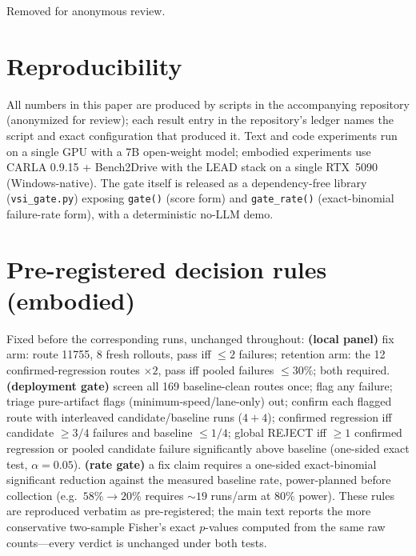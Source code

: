 \documentclass{article}
\begin{document}
\begin{ack}
Removed for anonymous review.
\end{ack}




\appendix

\section{Reproducibility}
All numbers in this paper are produced by scripts in the accompanying repository (anonymized for
review); each result entry in the repository's ledger names the script and exact configuration that
produced it. Text and code experiments run on a single GPU with a 7B open-weight model; embodied
experiments use CARLA 0.9.15 + Bench2Drive with the LEAD stack on a single RTX~5090 (Windows-native).
The gate itself is released as a dependency-free library (\texttt{vsi\_gate.py}) exposing
\texttt{gate()} (score form) and \texttt{gate\_rate()} (exact-binomial failure-rate form), with a
deterministic no-LLM demo.

\section{Pre-registered decision rules (embodied)}
\label{app:prereg}
Fixed before the corresponding runs, unchanged throughout: \textbf{(local panel)} fix arm: route 11755,
8 fresh rollouts, pass iff $\le 2$ failures; retention arm: the 12 confirmed-regression routes
$\times 2$, pass iff pooled failures $\le 30\%$; both required. \textbf{(deployment gate)} screen all
169 baseline-clean routes once; flag any failure; triage pure-artifact flags (minimum-speed/lane-only)
out; confirm each flagged route with interleaved candidate/baseline runs ($4{+}4$); confirmed regression
iff candidate $\ge 3/4$ failures and baseline $\le 1/4$; global REJECT iff $\ge 1$ confirmed regression
or pooled candidate failure significantly above baseline (one-sided exact test, $\alpha=0.05$).
\textbf{(rate gate)} a fix claim requires a one-sided exact-binomial significant reduction against the
measured baseline rate, power-planned before collection (e.g.\ $58\%\!\to\!20\%$ requires
${\sim}19$ runs/arm at $80\%$ power). These rules are reproduced verbatim as pre-registered; the main
text reports the more conservative two-sample Fisher's exact $p$-values computed from the same raw
counts---every verdict is unchanged under both tests.
\end{document}
